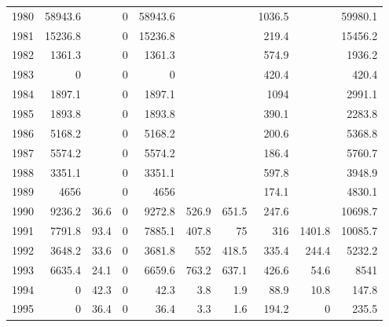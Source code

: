 \documentclass[]{article}
\begin{document}
\begin{table}[ht]
\begin{tabular}{lrrrrrrrrr}
1980 & 58943.6        &               & 0       & 58943.6 &             &         & 1036.5        &                & 59980.1     \\
1981 & 15236.8        &               & 0       & 15236.8 &             &         & 219.4         &                & 15456.2     \\
1982 & 1361.3         &               & 0       & 1361.3  &             &         & 574.9         &                & 1936.2      \\
1983 & 0              &               & 0       & 0       &             &         & 420.4         &                & 420.4       \\
1984 & 1897.1         &               & 0       & 1897.1  &             &         & 1094          &                & 2991.1      \\
1985 & 1893.8         &               & 0       & 1893.8  &             &         & 390.1         &                & 2283.8      \\
1986 & 5168.2         &               & 0       & 5168.2  &             &         & 200.6         &                & 5368.8      \\
1987 & 5574.2         &               & 0       & 5574.2  &             &         & 186.4         &                & 5760.7      \\
1988 & 3351.1         &               & 0       & 3351.1  &             &         & 597.8         &                & 3948.9      \\
1989 & 4656           &               & 0       & 4656    &             &         & 174.1         &                & 4830.1      \\
1990 & 9236.2         & 36.6          & 0       & 9272.8  & 526.9       & 651.5   & 247.6         &                & 10698.7     \\
1991 & 7791.8         & 93.4          & 0       & 7885.1  & 407.8       & 75      & 316           & 1401.8         & 10085.7     \\
1992 & 3648.2         & 33.6          & 0       & 3681.8  & 552         & 418.5   & 335.4         & 244.4          & 5232.2      \\
1993 & 6635.4         & 24.1          & 0       & 6659.6  & 763.2       & 637.1   & 426.6         & 54.6           & 8541        \\
1994 & 0              & 42.3          & 0       & 42.3    & 3.8         & 1.9     & 88.9          & 10.8           & 147.8       \\
1995 & 0              & 36.4          & 0       & 36.4    & 3.3         & 1.6     & 194.2         & 0              & 235.5       \\

\end{tabular}
\end{table}
\end{document}
